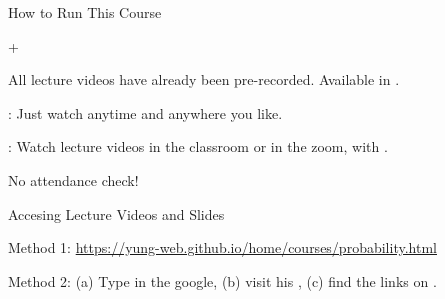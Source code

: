 \begin{frame}{How to Run This Course}

\plitemsep 0.12in

  \bci
\item<1->  + 

\item<2-> All lecture videos have already been pre-recorded.
  Available in .

\item<3->  : Just watch anytime and anywhere you
  like. 
\item <4-> : Watch lecture videos
  in the classroom
  or in the zoom, with .
\item <5-> No attendance check!



  \eci

\end{frame}

\begin{frame}{Accesing Lecture Videos and Slides}

\plitemsep 0.03in

  \bci
\item<1-> Method 1: \url{https://yung-web.github.io/home/courses/probability.html}

\item<2-> Method 2: (a) Type  in the google, (b) visit his , (c) find the links on .

{
}
{
}
\eci

\end{frame}

